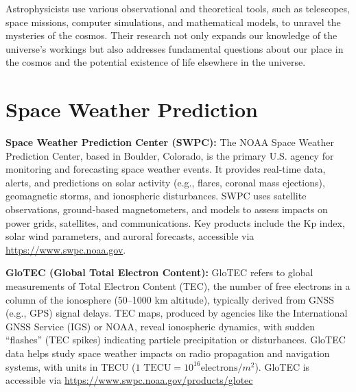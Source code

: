 Astrophysicists use various observational and theoretical tools, such as telescopes, space missions, computer simulations, and mathematical models, to unravel the mysteries of the cosmos. Their research not only expands our knowledge of the universe's workings but also addresses fundamental questions about our place in the cosmos and the potential existence of life elsewhere in the universe.


\section{Space Weather Prediction}

\textbf{Space Weather Prediction Center (SWPC):} The NOAA Space Weather Prediction Center, based in Boulder, Colorado, is the primary U.S. agency for monitoring and forecasting space weather events. It provides real-time data, alerts, and predictions on solar activity (e.g., flares, coronal mass ejections), geomagnetic storms, and ionospheric disturbances. SWPC uses satellite observations, ground-based magnetometers, and models to assess impacts on power grids, satellites, and communications. Key products include the Kp index, solar wind parameters, and auroral forecasts, accessible via \url{https://www.swpc.noaa.gov}.

\textbf{GloTEC (Global Total Electron Content):} GloTEC refers to global measurements of Total Electron Content (TEC), the number of free electrons in a column of the ionosphere (50--1000 km altitude), typically derived from GNSS (e.g., GPS) signal delays. TEC maps, produced by agencies like the International GNSS Service (IGS) or NOAA, reveal ionospheric dynamics, with sudden ``flashes'' (TEC spikes) indicating particle precipitation or disturbances. GloTEC data helps study space weather impacts on radio propagation and navigation systems, with units in TECU ($1\text{ TECU} = 10^{16}\text{electrons}/m^2$). GloTEC is accessible via \url{https://www.swpc.noaa.gov/products/glotec}
